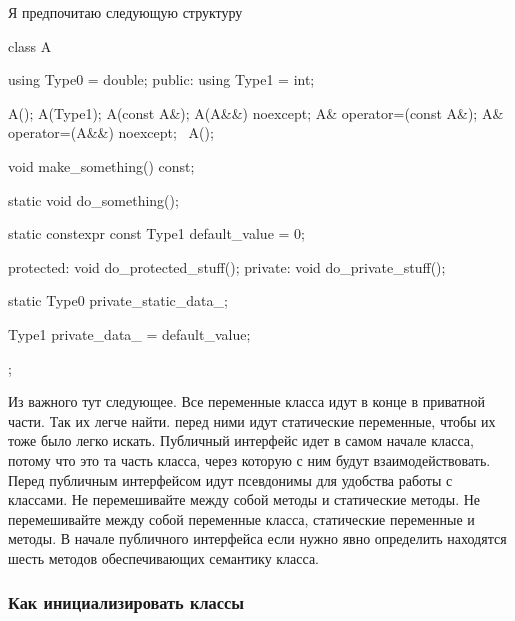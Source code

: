 Я предпочитаю следующую структуру
\begin{cppcode}
class A {
  using Type0 = double;
public:
  using Type1 = int;

  A();
  A(Type1);
  A(const A&);
  A(A&&) noexcept;
  A& operator=(const A&);
  A& operator=(A&&) noexcept;
  ~A();
  
  void make_something() const;
  
  static  void do_something();
  
  static constexpr const Type1 default_value = 0;

protected:
  void do_protected_stuff();
private:
  void do_private_stuff();

  static Type0 private_static_data_;
  
  Type1 private_data_ = default_value;
};
\end{cppcode}
Из важного тут следующее.
Все переменные класса идут в конце в приватной части.
Так их легче найти.
перед ними идут статические переменные, чтобы их тоже было легко искать.
Публичный интерфейс идет в самом начале класса, потому что это та часть класса, через которую с ним будут взаимодействовать.
Перед публичным интерфейсом идут псевдонимы для удобства работы с классами.
Не перемешивайте между собой методы и статические методы.
Не перемешивайте между собой переменные класса, статические переменные и методы.
В начале публичного интерфейса если нужно явно определить находятся шесть методов обеспечивающих семантику класса.

\subsubsection{Как инициализировать классы}


